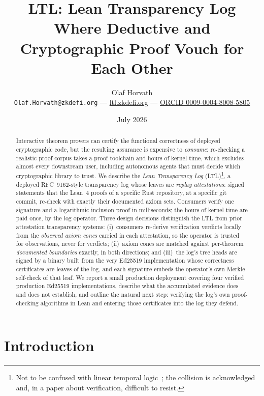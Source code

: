 \documentclass[10pt,twocolumn]{article}
\title{\textbf{LTL: Lean Transparency Log}\\[2pt]
\large Where Deductive and Cryptographic Proof Vouch for Each Other}
\author{Olaf Horvath\\ \small \texttt{Olaf.Horvath@zkdefi.org} --- \url{ltl.zkdefi.org} --- \href{https://orcid.org/0009-0004-8008-5805}{ORCID 0009-0004-8008-5805}}
\date{July 2026}
\begin{document}
\maketitle

\begin{abstract}
Interactive theorem provers can certify the functional correctness of
deployed cryptographic code, but the resulting assurance is expensive to
\emph{consume}: re-checking a realistic proof corpus takes a proof
toolchain and hours of kernel time, which excludes almost every
downstream user, including autonomous agents that must decide which
cryptographic library to trust. We describe the \emph{Lean Transparency
Log} (LTL)\footnote{Not to be confused with linear temporal
logic~\cite{pnueli77}; the collision is acknowledged and, in a paper
about verification, difficult to resist.}, a deployed RFC~9162-style
transparency log whose leaves are \emph{replay attestations}: signed
statements that the Lean~4 proofs of a specific Rust repository, at a
specific git commit, re-check with exactly their documented axiom sets.
Consumers verify one signature and a logarithmic inclusion proof in
milliseconds; the hours of kernel time are paid once, by the log
operator. Three design decisions distinguish the LTL from prior
attestation transparency systems: (i)~consumers re-derive verification
verdicts locally from the \emph{observed axiom cones} carried in each
attestation, so the operator is trusted for observations, never for
verdicts; (ii)~axiom cones are matched against per-theorem
\emph{documented boundaries} exactly, in both directions; and (iii)~the
log's tree heads are signed by a binary built from the very Ed25519
implementation whose correctness certificates are leaves of the log, and
each signature embeds the operator's own Merkle self-check of that leaf.
We report a small production deployment covering four verified
production Ed25519 implementations, describe what the accumulated
evidence does and does not establish, and outline the natural next step:
verifying the log's own proof-checking algorithms in Lean and entering
those certificates into the log they defend.
\end{abstract}

\section{Introduction}
\label{sec:intro}
\end{document}
